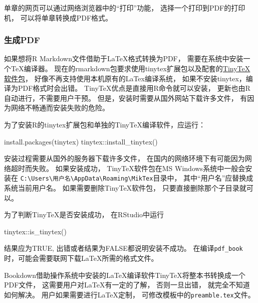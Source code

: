 \documentclass[
]{article}
\newenvironment{Shaded}{\begin{snugshade}}{\end{snugshade}}
\newcommand{\FunctionTok}[1]{\textcolor[rgb]{0.00,0.00,0.00}{#1}}
\newcommand{\NormalTok}[1]{#1}
\newcommand{\SpecialCharTok}[1]{\textcolor[rgb]{0.00,0.00,0.00}{#1}}
\newcommand{\StringTok}[1]{\textcolor[rgb]{0.31,0.60,0.02}{#1}}
\begin{document}
单章的网页可以通过网络浏览器中的``打印''功能，
选择一个打印到PDF的打印机，
可以将单章转换成PDF格式。

\hypertarget{usage-pdfbook}{%
\subsubsection{生成PDF}\label{usage-pdfbook}}

如果想将R Markdown文件借助于LaTeX格式转换为PDF，
需要在系统中安装一个TeX编译器。
现在的rmarkdown包要求使用tinytex扩展包以及配套的\href{https://yihui.name/tinytex/}{TinyTeX软件包}，
好像不再支持使用本机原有的LaTex编译系统，
如果不安装tinytex，编译为PDF格式时会出错。
TinyTeX优点是直接用R命令就可以安装，
更新也由R自动进行，不需要用户干预。
但是，安装时需要从国外网站下载许多文件，
有因为网络不畅通而安装失败的危险。

为了安装R的tinytex扩展包和单独的TinyTeX编译软件，应运行：

\begin{Shaded}
\begin{Highlighting}[]
\FunctionTok{install.packages}\NormalTok{(}\StringTok{\textquotesingle{}tinytex\textquotesingle{}}\NormalTok{)}
\NormalTok{tinytex}\SpecialCharTok{::}\FunctionTok{install\_tinytex}\NormalTok{()}
\end{Highlighting}
\end{Shaded}

安装过程需要从国外的服务器下载许多文件，
在国内的网络环境下有可能因为网络超时而失败。
如果安装成功，
TinyTeX软件包在MS Windows系统中一般会安装在 \texttt{C:\textbackslash{}Users\textbackslash{}用户名\textbackslash{}AppData\textbackslash{}Roaming\textbackslash{}MikTex}目录中，
其中``用户名''应替换成系统当前用户名。
如果需要删除TinyTeX软件包， 只要直接删除那个子目录就可以。

为了判断TinyTeX是否安装成功， 在RStudio中运行

\begin{Shaded}
\begin{Highlighting}[]
\NormalTok{tinytex}\SpecialCharTok{::}\FunctionTok{is\_tinytex}\NormalTok{()}
\end{Highlighting}
\end{Shaded}

结果应为TRUE, 出错或者结果为FALSE都说明安装不成功。
在编译\texttt{pdf\_book}时，可能会需要联网下载LaTeX所需的格式文件。

Bookdown借助操作系统中安装的LaTeX编译软件TinyTeX将整本书转换成一个PDF文件，
这需要用户对LaTeX有一定的了解，
否则一旦出错，
就完全不知道如何解决。
用户如果需要进行LaTeX定制，
可修改模板中的\texttt{preamble.tex}文件。
\end{document}
